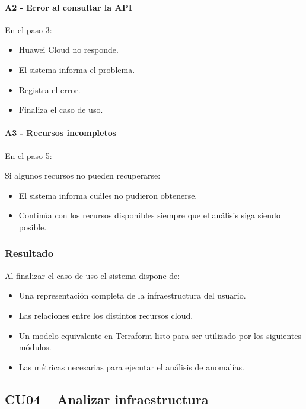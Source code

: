 \paragraph{A2 - Error al consultar la API}

En el paso 3:

\begin{itemize}
\item Huawei Cloud no responde.
\item El sistema informa el problema.
\item Registra el error.
\item Finaliza el caso de uso.
\end{itemize}

\paragraph{A3 - Recursos incompletos}

En el paso 5:

Si algunos recursos no pueden recuperarse:

\begin{itemize}
\item El sistema informa cuáles no pudieron obtenerse.
\item Continúa con los recursos disponibles siempre que el análisis siga siendo posible.
\end{itemize}

\subsubsection*{Resultado}

Al finalizar el caso de uso el sistema dispone de:

\begin{itemize}
\item Una representación completa de la infraestructura del usuario.
\item Las relaciones entre los distintos recursos cloud.
\item Un modelo equivalente en Terraform listo para ser utilizado por los siguientes módulos.
\item Las métricas necesarias para ejecutar el análisis de anomalías.
\end{itemize}

\subsection{CU04 -- Analizar infraestructura}

